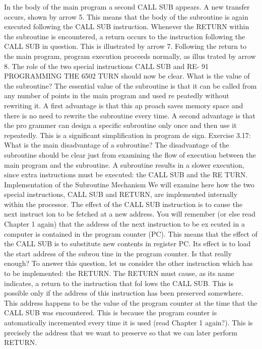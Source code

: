 In the body of the main program a second CALL SUB appears.
A new transfer occurs, shown by arrow 5. This means that the
body of the subroutine is again executed following the CALL SUB
instruction.
Whenever the RETURN within the subroutine is encountered,
a return occurs to the instruction following the CALL SUB in
question. This is illustrated by arrow 7. Following the return to
the main program, program execution proceeds normally, as illus
trated by arrow 8.
The role of the two special instructions CALL SUB and RE-
91
PROGRAMMING THE 6502
TURN should now be clear. What is the value of the subroutine?
The essential value of the subroutine is that it can be called
from any number of points in the main program and used re
peatedly without rewriting it. A first advantage is that this ap
proach saves memory space and there is no need to rewrite the
subroutine every time. A second advantage is that the pro
grammer can design a specific subroutine only once and then use
it repeatedly. This is a significant simplification in program de
sign.
Exercise 3.17: What is the main disadvantage of a subroutine?
The disadvantage of the subroutine should be clear just from
examining the flow of execution between the main program and
the subroutine. A subroutine results in a slower execution, since
extra instructions must be executed: the CALL SUB and the RE
TURN.
Implementation of the Subroutine Mechanism
We will examine here how the two special instructions, CALL
SUB and RETURN, are implemented internally within the processor.
The effect of the CALL SUB instruction is to cause the next instruct
ion to be fetched at a new address. You will remember (or else read
Chapter 1 again) that the address of the next instruction to be ex
ecuted in a computer is contained in the program counter (PC). This
means that the effect of the CALL SUB is to substitute new contents
in register PC. Its effect is to load the start address of the subrou
tine in the program counter. Is that really enough?
To answer this question, let us consider the other instruction
which has to be implemented: the RETURN. The RETURN must
cause, as its name indicates, a return to the instruction that fol
lows the CALL SUB. This is possible only if the address of this
instruction has been preserved somewhere. This address happens
to be the value of the program counter at the time that the CALL
SUB was encountered. This is because the program counter is
automatically incremented every time it is used (read Chapter 1
again?). This is precisely the address that we want to preserve so
that we can later perform RETURN.
